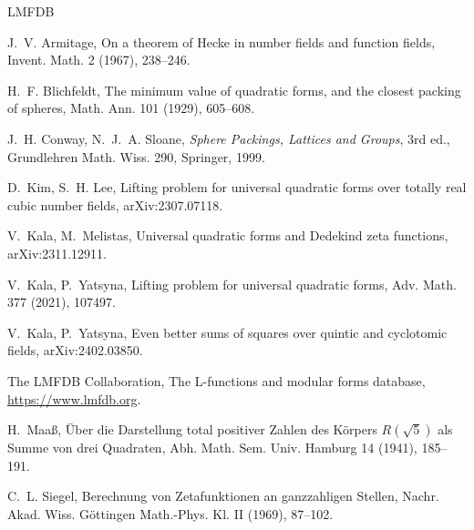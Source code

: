 \documentclass[11pt]{amsart}
\theoremstyle{definition}
\numberwithin{equation}{section}
\begin{document}
\begin{thebibliography}{LMFDB}

J.~V. Armitage, On a theorem of Hecke in number fields and function fields,
Invent. Math. 2 (1967), 238--246.

H.~F. Blichfeldt, The minimum value of quadratic forms, and the closest packing of spheres,
Math. Ann. 101 (1929), 605--608.

J.~H. Conway, N.~J.~A. Sloane,
\emph{Sphere Packings, Lattices and Groups}, 3rd ed., Grundlehren Math. Wiss. 290,
Springer, 1999.

D.~Kim, S.~H. Lee, Lifting problem for universal quadratic forms over totally real cubic number
fields, arXiv:2307.07118.

V.~Kala, M.~Melistas, Universal quadratic forms and Dedekind zeta functions, arXiv:2311.12911.

V.~Kala, P.~Yatsyna, Lifting problem for universal quadratic forms,
Adv. Math. 377 (2021), 107497.

V.~Kala, P.~Yatsyna, Even better sums of squares over quintic and cyclotomic fields,
arXiv:2402.03850.

The LMFDB Collaboration, The L-functions and modular forms database, \url{https://www.lmfdb.org}.

H.~Maa\ss, \"Uber die Darstellung total positiver Zahlen des K\"orpers $R(\sqrt5)$ als Summe von drei
Quadraten, Abh. Math. Sem. Univ. Hamburg 14 (1941), 185--191.

C.~L. Siegel, Berechnung von Zetafunktionen an ganzzahligen Stellen,
Nachr. Akad. Wiss. G\"ottingen Math.-Phys. Kl. II (1969), 87--102.

\end{thebibliography}
\end{document}
